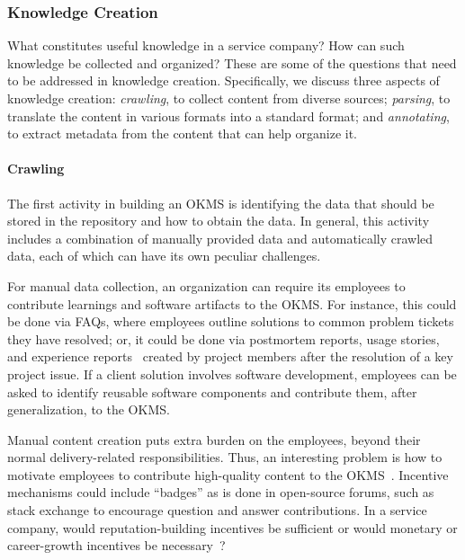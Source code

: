 
\subsubsection{Knowledge Creation}

What constitutes useful knowledge in a service company? How can such knowledge
be collected and organized? These are some of the questions that need to be
addressed in knowledge creation. Specifically, we discuss three aspects of
knowledge creation: \textit{crawling}, to collect content from diverse
sources; \textit{parsing}, to translate the content in various formats into a
standard format; and \textit{annotating}, to extract metadata from the content
that can help organize it.

\vskip -5pt
\paragraph*{Crawling} The first activity in building an OKMS is
identifying the data that should be stored in the repository and how to obtain
the data. In general, this activity includes a combination of manually provided
data and automatically crawled data, each of which can have its own peculiar
challenges.

For manual data collection, an organization can require its employees to
contribute learnings and software artifacts to the OKMS. For instance, this
could be done via FAQs, where employees outline solutions to common problem
tickets they have resolved; or, it could be done via postmortem reports, usage
stories, and experience reports~\cite{desouza:2005} created by project members
after the resolution of a key project issue. If a client solution involves
software development, employees can be asked to identify reusable software
components and contribute them, after generalization, to the OKMS.

Manual content creation puts extra burden on the employees, beyond their normal
delivery-related responsibilities. Thus, an interesting problem is how to
motivate employees to contribute high-quality content to the
OKMS~\cite{hendriks1999share}. Incentive mechanisms could include ``badges'' as
is done in open-source forums, such as stack exchange to encourage question and
answer contributions. In a service company, would reputation-building incentives
be sufficient or would monetary or career-growth incentives be
necessary~\cite{bartol2002encouraging}?

